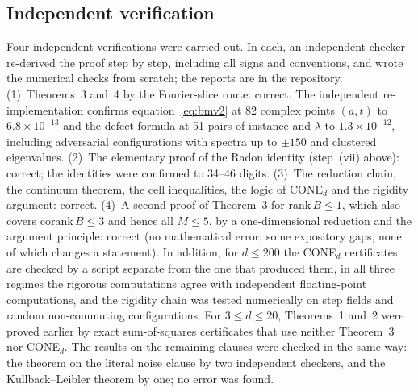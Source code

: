 \documentclass[11pt]{article}
\begin{document}
\subsection*{Independent verification}
Four independent verifications were carried out. In each, an independent checker re-derived the proof step by step,
including all signs and conventions, and wrote the numerical checks from scratch; the reports are in the repository.
(1)~Theorems~3 and~4 by the Fourier-slice route: correct. The independent re-implementation confirms
equation~\eqref{eq:bmv2} at 82 complex points $(a,t)$ to $6.8\times10^{-13}$ and the defect formula at 51 pairs of
instance and $\lambda$ to $1.3\times10^{-12}$, including adversarial configurations with spectra up to $\pm150$ and
clustered eigenvalues. (2)~The elementary proof of the Radon identity (step~(vii) above): correct; the identities were
confirmed to 34--46 digits. (3)~The reduction chain, the continuum theorem, the cell inequalities, the logic of
CONE$_d$ and the rigidity argument: correct. (4)~A second proof of Theorem~3 for $\mathrm{rank}\,B\le1$, which also
covers $\mathrm{corank}\,B\le3$ and hence all $M\le5$, by a one-dimensional reduction and the argument principle:
correct (no mathematical error; some expository gaps, none of which changes a statement). In addition, for $d\le200$ the CONE$_d$ certificates are checked by a script separate from the one that
produced them, in all three regimes the rigorous computations agree with independent floating-point computations, and
the rigidity chain was tested numerically on step fields and random non-commuting configurations. For $3\le d\le20$,
Theorems~1 and~2 were proved earlier by exact sum-of-squares certificates that use neither Theorem~3 nor
CONE$_d$\cite{repoCGLMP}. The results on the remaining clauses were checked in the same way: the theorem on the
literal noise clause by two independent checkers, and the Kullback--Leibler theorem by one; no error was found.
\end{document}
